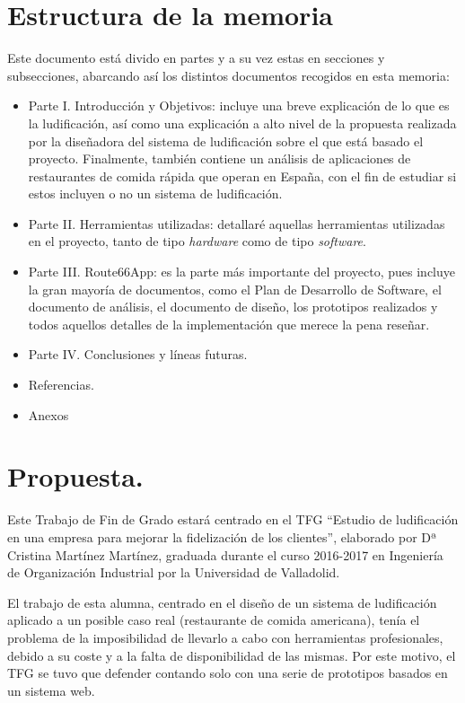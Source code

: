 \documentclass[twoside]{report}
\begin{document}
\section{Estructura de la memoria}

Este documento está divido en partes y a su vez estas en secciones y subsecciones, abarcando así los distintos documentos recogidos en esta memoria:

\begin{itemize}
\item Parte I. Introducción y Objetivos: incluye una breve explicación de lo que es la ludificación, así como una explicación a alto nivel de la propuesta realizada por la diseñadora del sistema de ludificación sobre el que está basado el proyecto. Finalmente, también contiene un análisis de aplicaciones de restaurantes de comida rápida que operan en España, con el fin de estudiar si estos incluyen o no un sistema de ludificación.

\item Parte II. Herramientas utilizadas: detallaré aquellas herramientas utilizadas en el proyecto, tanto de tipo \textit{hardware} como de tipo \textit{software}. 

\item Parte III. Route66App: es la parte más importante del proyecto, pues incluye la gran mayoría de documentos, como el Plan de Desarrollo de Software, el documento de análisis, el documento de diseño, los prototipos realizados y todos aquellos detalles de la implementación que merece la pena reseñar.

\item Parte IV. Conclusiones y líneas futuras.

\item Referencias.

\item Anexos

\end{itemize}

\section{Propuesta.}
Este Trabajo de Fin de Grado estará centrado en el TFG “Estudio de ludificación en una empresa para mejorar la fidelización de los clientes”\cite{cristinatfg}, elaborado por Dª Cristina Martínez Martínez, graduada durante el curso 2016-2017 en Ingeniería de Organización Industrial por la Universidad de Valladolid.  

El trabajo de esta alumna, centrado en el diseño de un sistema de ludificación aplicado a un posible caso real (restaurante de comida americana), tenía el problema de la imposibilidad de llevarlo a cabo con herramientas profesionales, debido a su coste y a la falta de disponibilidad de las mismas. Por este motivo, el TFG se tuvo que defender contando solo con una serie de prototipos basados en un sistema web. 
\end{document}
